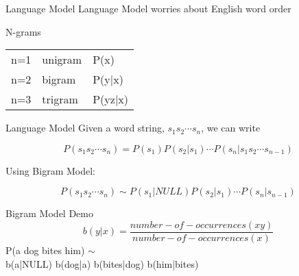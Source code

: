 \documentclass{beamer}
\begin{document}
\begin{frame}{Language Model}
        Language Model worries about English word order
    \pause
    \begin{block}{N-grams}
        \begin{tabular}{ l  l  l}
            n=1 & unigram & P(x)\\
            n=2 & bigram  & P(y|x)\\
            n=3 & trigram & P(yz|x)
        \end{tabular}
    \end{block}

\end{frame}

\begin{frame}{Language Model}
Given a word string, $s_1 s_2 \cdots s_n$, we can write
    \pause
    \begin{displaybox}{10cm}     %
    \[ 
    P(s_1 s_2 \cdots s_n) 
        = P(s_1)P(s_2|s_1) \cdots P(s_n|s_1 s_2 \cdots s_{n-1})
     \] 
     \end{displaybox} 
    \pause
Using Bigram Model:
    \pause
    \begin{displaybox}{10cm}     %
    \[ 
    P(s_1 s_2 \cdots s_n) 
        \sim P(s_1|NULL)P(s_2|s_1) \cdots P(s_n|s_{n-1})
     \] 
     \end{displaybox} 

    \pause
    \begin{block}{Bigram Model Demo}
        $$
        b(y|x) = \frac{number-of-occurrences(xy)}
                {number-of-occurrences(x)}
        $$
        P(a dog bites him) $\sim$\\
        b(a|NULL) b(dog|a)  b(bites|dog)  b(him|bites)
    \end{block}

\end{frame}
\end{document}
